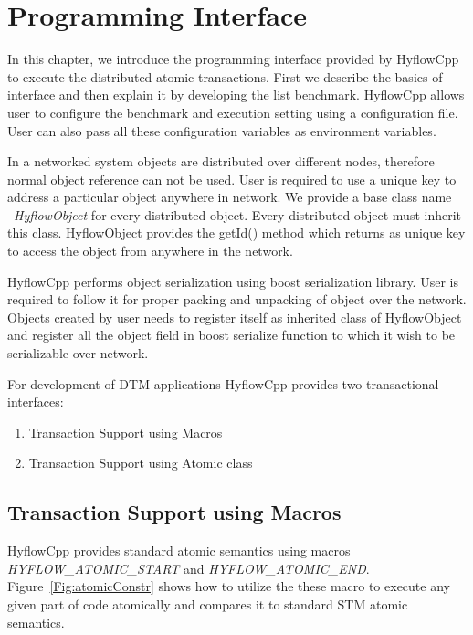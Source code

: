 \documentclass[12pt,english]{report}
\begin{document}
\chapter{Programming Interface}\label{chap:progInterface}

In this chapter, we introduce the programming interface provided by HyflowCpp to execute the distributed atomic transactions. First we describe the basics of interface and then explain it by developing the list benchmark. HyflowCpp allows user to configure the benchmark and execution setting using a configuration file. User can also pass all these configuration variables as environment variables.

In a networked system objects are distributed over different nodes, therefore normal object reference can not be used. User is required to use a unique key to address a particular object anywhere in network. We provide a base class name ~\emph{HyflowObject} for every distributed object. Every distributed object must inherit this class. HyflowObject provides the getId() method which returns as unique key to access the object from anywhere in the network.

HyflowCpp performs object serialization using boost serialization library. User is required to follow it for proper packing and unpacking of object over the network. Objects created by user needs to register itself as inherited class of HyflowObject and register all the object field in boost serialize function to which it wish to be serializable over network.

For development of DTM applications HyflowCpp provides two transactional interfaces: 
\begin{enumerate}
\item Transaction Support using Macros
\item Transaction Support using Atomic class 
\end{enumerate}

\section{Transaction Support using Macros}

HyflowCpp provides standard atomic semantics using macros \emph{HYFLOW{\_}ATOMIC{\_}START} and \emph{HYFLOW{\_}ATOMIC{\_}END}. Figure~\ref{Fig:atomicConstr} shows how to utilize the these macro to execute any given part of code atomically and compares it to standard STM atomic semantics. 
\end{document}
